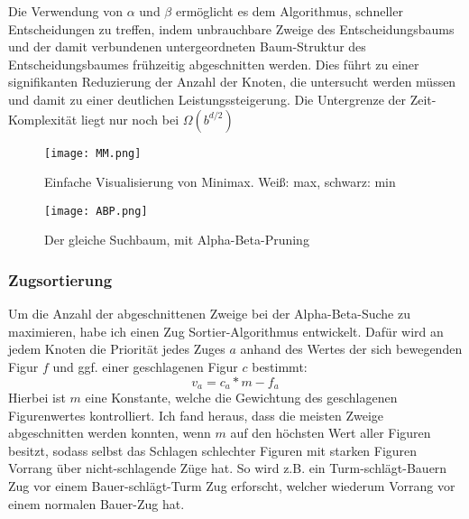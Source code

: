 \documentclass{jpp}
\begin{document}
Die Verwendung von $\alpha$ und $\beta$ ermöglicht es dem Algorithmus, schneller Entscheidungen zu treffen, indem unbrauchbare Zweige des Entscheidungsbaums und der damit verbundenen untergeordneten Baum-Struktur des Entscheidungsbaumes frühzeitig abgeschnitten werden. Dies führt zu einer signifikanten Reduzierung der Anzahl der Knoten, die untersucht werden müssen und damit zu einer deutlichen Leistungssteigerung. Die Untergrenze der Zeit-Komplexität liegt nur noch bei $\Omega(b^{d/2})$
\begin{figure}
  \centering
  \begin{minipage}[b]{0.49\textwidth}
    \texttt{[image: MM.png]}
    \caption{Einfache Visualisierung von Minimax. Weiß: max, schwarz: min}
    \label{fig:minimax}
  \end{minipage}
  \hfill
  \begin{minipage}[b]{0.49\textwidth}
    \texttt{[image: ABP.png]}
    \caption{Der gleiche Suchbaum, mit Alpha-Beta-Pruning}
    \label{fig:alphabeta}
  \end{minipage}
\end{figure}
\subsubsection{Zugsortierung}
Um die Anzahl der abgeschnittenen Zweige bei der Alpha-Beta-Suche zu maximieren, habe ich einen Zug Sortier-Algorithmus entwickelt. Dafür wird an jedem Knoten die Priorität jedes Zuges $a$ anhand des Wertes der sich bewegenden Figur $f$ und ggf. einer geschlagenen Figur $c$ bestimmt:
\[v_a = c_a * m - f_a\]
Hierbei ist $m$ eine Konstante, welche die Gewichtung des geschlagenen Figurenwertes kontrolliert. Ich fand heraus, dass die meisten Zweige abgeschnitten werden konnten, wenn $m$ auf den höchsten Wert aller Figuren besitzt, sodass selbst das Schlagen schlechter Figuren mit starken Figuren Vorrang über nicht-schlagende Züge hat.
So wird z.B. ein Turm-schlägt-Bauern Zug vor einem Bauer-schlägt-Turm Zug erforscht, welcher wiederum Vorrang vor einem normalen Bauer-Zug hat.
\end{document}
